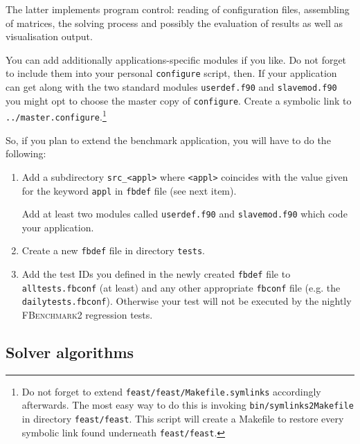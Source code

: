 The latter implements program control: reading of configuration files,
assembling of matrices, the solving process and possibly the evaluation of results
as well as visualisation output.

You can add additionally applications-specific modules if you like. Do not
forget to include them into your personal \texttt{configure} script, then. If
your application can get along with the two standard modules
\texttt{userdef.f90} and \texttt{slavemod.f90} you might opt to choose the
master copy of \texttt{configure}. Create a symbolic link to
\texttt{../master.configure}.\footnote{Do not forget to extend
  \texttt{feast/feast/Makefile.symlinks} accordingly afterwards. The most easy
  way to do this is invoking \texttt{bin/symlinks2Makefile} in directory
  \texttt{feast/feast}. This script will create a Makefile to restore every
  symbolic link found underneath \texttt{feast/feast}.}

So, if you plan to extend the benchmark application, you will have to do the
following:
\begin{enumerate}
\item Add a subdirectory \texttt{src\_<appl>} where \texttt{<appl>} coincides
  with the value given for the keyword \texttt{appl} in \texttt{fbdef} file (see
  next item).

  Add at least two modules called \texttt{userdef.f90} and
  \texttt{slavemod.f90} which code your application.

\item Create a new \texttt{fbdef} file in directory \texttt{tests}.

\item Add the test IDs you defined in the newly created \texttt{fbdef} file to
  \texttt{alltests.fbconf} (at least) and any other appropriate \texttt{fbconf}
  file (e.g. the \texttt{dailytests.fbconf}). Otherwise your test will not be
  executed by the nightly \textsc{FBenchmark2} regression tests.
\end{enumerate}



\subsection{Solver algorithms}
\label{sec:fbenchmark2:solver_algorithms}

